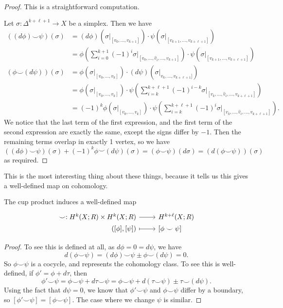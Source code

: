 \documentclass[a4paper]{article}
\begin{document}
\begin{proof}
  This is a straightforward computation.

  Let $\sigma: \Delta^{k + \ell + 1} \to X$ be a simplex. Then we have
  \begin{align*}
    ((d \phi)\smile \psi)(\sigma) &= (d \phi)(\sigma|_{[v_0, \ldots, v_{k + 1}]}) \cdot \psi(\sigma|_{[v_{k + 1}, \ldots, v_{k + \ell + 1}]})\\
    &= \phi\left(\sum_{i = 0}^{k + 1} (-1)^i \sigma|_{[v_0, \ldots, \hat{v}_i, \ldots, v_{k + 1}]}\right) \cdot \psi(\sigma|_{[v_{k + 1}, \ldots, v_{k + \ell + 1}]})\\
    (\phi \smile (d \psi))(\sigma) &= \phi(\sigma|_{[v_0, \ldots, v_k]}) \cdot (d \psi)(\sigma|_{v_k,\ldots, v_{k + \ell + 1}]})\\
    &=\phi(\sigma|_{[v_0, \ldots, v_k]}) \cdot \psi\left(\sum_{i = k}^{k + \ell + 1} (-1)^{i - k} \sigma|_{[v_k, \ldots, \hat{v}_i, \ldots, v_{k + \ell + 1}]}\right)\\
    &=(-1)^k \phi(\sigma|_{[v_0, \ldots, v_k]}) \cdot \psi\left(\sum_{i = k}^{k + \ell + 1} (-1)^{i} \sigma|_{[v_k, \ldots, \hat{v}_i, \ldots, v_{k + \ell + 1}]}\right).
  \end{align*}
  We notice that the last term of the first expression, and the first term of the second expression are exactly the same, except the signs differ by $-1$. Then the remaining terms overlap in exactly 1 vertex, so we have
  \[
    ((d \phi) \smile \psi)(\sigma) + (-1)^k \phi \smile (d \psi)(\sigma) = (\phi \smile \psi)(d \sigma) = (d (\phi \smile \psi))(\sigma)
  \]
  as required.
\end{proof}
This is the most interesting thing about these things, because it tells us this gives a well-defined map on cohomology.

\begin{cor}
  The cup product induces a well-defined map
  \[
    \begin{tikzcd}[row sep = 0ex
        ,/tikz/column 1/.append style={anchor=base east}
        ,/tikz/column 2/.append style={anchor=base west}
      ]
      \smile: H^k(X; R) \times H^k(X; R) \ar[r] & H^{k + \ell}(X; R)\\
      ([\phi], [\psi] ) \ar[r, maps to] & \lbrack\phi \smile \psi\rbrack
    \end{tikzcd}
  \]
\end{cor}

\begin{proof}
  To see this is defined at all, as $d \phi = 0 = d \psi$, we have
  \[
    d (\phi \smile \psi) = (d \phi) \smile \psi \pm \phi \smile (d \psi) = 0.
  \]
  So $\phi \smile \psi$ is a cocycle, and represents the cohomology class. To see this is well-defined, if $\phi' = \phi + d\tau$, then
  \[
    \phi' \smile \psi = \phi \smile \psi + d \tau \smile \psi = \phi \smile \psi + d(\tau \smile \psi) \pm \tau \smile (d \psi).
  \]
  Using the fact that $d \psi = 0$, we know that $\phi' \smile \psi$ and $\phi \smile \psi$ differ by a boundary, so $[\phi' \smile \psi] = [\phi \smile \psi]$. The case where we change $\psi$ is similar.
\end{proof}
\end{document}
